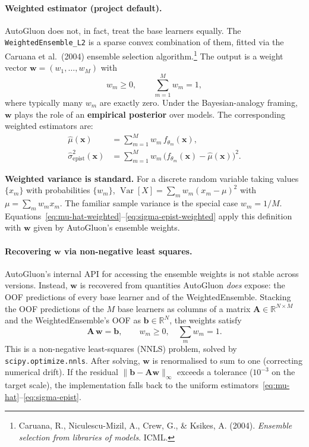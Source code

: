 \documentclass[11pt,a4paper]{article}
\DeclareMathOperator{\Var}{Var}
\begin{document}
\paragraph{Weighted estimator (project default).} AutoGluon does not, in fact, treat the base learners equally. The \texttt{WeightedEnsemble\_L2} is a sparse convex combination of them, fitted via the Caruana et al.~(2004) ensemble selection algorithm.\footnote{Caruana, R., Niculescu-Mizil, A., Crew, G., \& Ksikes, A. (2004). \emph{Ensemble selection from libraries of models}. ICML.} The output is a weight vector $\bm w = (w_1, \ldots, w_M)$ with
\[
w_m \geq 0, \qquad \sum_{m=1}^M w_m = 1,
\]
where typically many $w_m$ are exactly zero. Under the Bayesian-analogy framing, $\bm w$ plays the role of an \textbf{empirical posterior} over models. The corresponding weighted estimators are:
\begin{align}
\hat\mu(\bm x)
&= \sum_{m=1}^M w_m \, f_{\theta_m}(\bm x),
\label{eq:mu-hat-weighted}\\
\hat\sigma^2_{\text{epist}}(\bm x)
&= \sum_{m=1}^M w_m \, \big(f_{\theta_m}(\bm x) - \hat\mu(\bm x)\big)^2.
\label{eq:sigma-epist-weighted}
\end{align}

\begin{recapbox}
\textbf{Weighted variance is standard.} For a discrete random variable taking values $\{x_m\}$ with probabilities $\{w_m\}$, $\Var[X] = \sum_m w_m (x_m - \mu)^2$ with $\mu = \sum_m w_m x_m$. The familiar sample variance is the special case $w_m = 1/M$. Equations~\eqref{eq:mu-hat-weighted}--\eqref{eq:sigma-epist-weighted} apply this definition with $\bm w$ given by AutoGluon's ensemble weights.
\end{recapbox}

\paragraph{Recovering $\bm w$ via non-negative least squares.} AutoGluon's internal API for accessing the ensemble weights is not stable across versions. Instead, $\bm w$ is recovered from quantities AutoGluon \emph{does} expose: the OOF predictions of every base learner and of the WeightedEnsemble. Stacking the OOF predictions of the $M$ base learners as columns of a matrix $\mathbf{A} \in \mathbb{R}^{N \times M}$ and the WeightedEnsemble's OOF as $\bm b \in \mathbb{R}^N$, the weights satisfy
\begin{equation}
\mathbf{A} \, \bm w = \bm b, \qquad w_m \geq 0, \quad \sum_m w_m = 1.
\label{eq:nnls}
\end{equation}
This is a non-negative least-squares (NNLS) problem, solved by \texttt{scipy.optimize.nnls}. After solving, $\bm w$ is renormalised to sum to one (correcting numerical drift). If the residual $\|\bm b - \mathbf{A}\bm w\|_\infty$ exceeds a tolerance ($10^{-3}$ on the target scale), the implementation falls back to the uniform estimators~\eqref{eq:mu-hat}--\eqref{eq:sigma-epist}.
\end{document}
